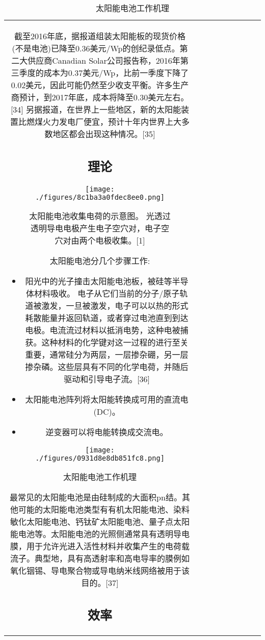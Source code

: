 \begin{table}[ht]
\begin{tabular}{|c|c|c|c|c|c|c|c|c}
截至2016年底，据报道组装太阳能板的现货价格 (不是电池)已降至0.36美元/Wp的创纪录低点。第二大供应商Canadian Solar公司报告称，2016年第三季度的成本为0.37美元/Wp，比前一季度下降了0.02美元，因此可能仍然至少收支平衡。许多生产商预计，到2017年底，成本将降至0.30美元左右。[34] 另据报道，在世界上一些地区，新的太阳能装置比燃煤火力发电厂便宜，预计十年内世界上大多数地区都会出现这种情况。[35]

\subsection{理论}

\begin{figure}[ht]
\centering
\texttt{[image: ./figures/8c1ba3a0fdec8ee0.png]}
\caption{太阳能电池收集电荷的示意图。 光透过透明导电电极产生电子空穴对，电子空穴对由两个电极收集。[1]} \label{fig_TYNDC_10}
\end{figure}

太阳能电池分几个步骤工作:

\begin{itemize}
\item 阳光中的光子撞击太阳能电池板，被硅等半导体材料吸收。
电子从它们当前的分子/原子轨道被激发，一旦被激发，电子可以以热的形式耗散能量并返回轨道，或者穿过电池直到到达电极。电流流过材料以抵消电势，这种电被捕获。这种材料的化学键对这一过程的进行至关重要，通常硅分为两层，一层掺杂硼，另一层掺杂磷。这些层具有不同的化学电荷，并随后驱动和引导电子流。[36]
\item 太阳能电池阵列将太阳能转换成可用的直流电(DC)。
\item 逆变器可以将电能转换成交流电。
\end{itemize}

\begin{figure}[ht]
\centering
\texttt{[image: ./figures/0931d8e8db851fc8.png]}
\caption{太阳能电池工作机理} \label{fig_TYNDC_11}
\end{figure}

最常见的太阳能电池是由硅制成的大面积pn结。其他可能的太阳能电池类型有有机太阳能电池、染料敏化太阳能电池、钙钛矿太阳能电池、量子点太阳能电池等。太阳能电池的光照侧通常具有透明导电膜，用于允许光进入活性材料并收集产生的电荷载流子。典型地，具有高透射率和高电导率的膜例如氧化铟锡、导电聚合物或导电纳米线网络被用于该目的。[37]

\subsection{效率}


\end{tabular}
\end{table}
